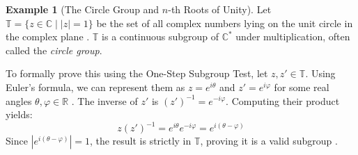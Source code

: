 \documentclass[11pt]{article}
\theoremstyle{definition}
\newtheorem{example}{Example}[section]
\theoremstyle{plain}
\theoremstyle{remark}
\begin{document}
\begin{example}[The Circle Group and $n$-th Roots of Unity]
Let $\mathbb{T} = \{z \in \mathbb{C} \mid |z| = 1\}$ be the set of all complex numbers lying on the unit circle in the complex plane \cite{dummit}. $\mathbb{T}$ is a continuous subgroup of $\mathbb{C}^*$ under multiplication, often called the \emph{circle group}. 

To formally prove this using the One-Step Subgroup Test, let $z, z' \in \mathbb{T}$. Using Euler's formula, we can represent them as $z = e^{i\theta}$ and $z' = e^{i\varphi}$ for some real angles $\theta, \varphi \in \mathbb{R}$ \cite{gallian}. 
The inverse of $z'$ is $(z')^{-1} = e^{-i\varphi}$. Computing their product yields:
\begin{equation}
    z(z')^{-1} = e^{i\theta}e^{-i\varphi} = e^{i(\theta - \varphi)}
\end{equation}
Since $|e^{i(\theta - \varphi)}| = 1$, the result is strictly in $\mathbb{T}$, proving it is a valid subgroup \cite{fraleigh}.

\begin{figure}[htbp]
    \centering
\end{figure}
\end{example}
\end{document}
